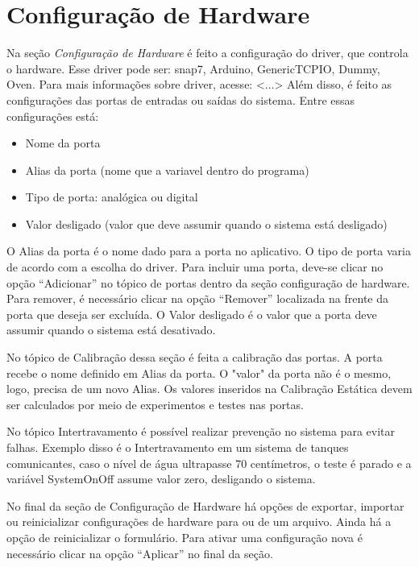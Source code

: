 
\chapter{Configuração de Hardware}%
\label{chapter:hardware-configuration}

Na seção \textit{Configuração de Hardware} é feito a configuração do driver, que
controla o hardware. Esse driver pode ser: snap7, Arduino, GenericTCPIO, Dummy,
Oven. Para mais informações sobre driver, acesse: <...> Além disso, é feito as
configurações das portas de entradas ou saídas do sistema. Entre essas
configurações está:

\begin{itemize}
    \item Nome da porta
    \item Alias da porta (nome que a variavel dentro do programa)
    \item Tipo de porta: analógica ou digital
    \item Valor desligado (valor que deve assumir quando o sistema está desligado)
\end{itemize}

O Alias da porta é o nome dado para a porta no aplicativo. O tipo de porta
varia de acordo com a escolha do driver. Para incluir uma porta, deve-se clicar
no opção “Adicionar” no tópico de portas dentro da seção configuração de
hardware. Para remover, é necessário clicar na opção “Remover” localizada na
frente da porta que deseja ser excluída. O Valor desligado é o valor que a
porta deve assumir quando o sistema está desativado.

No tópico de Calibração dessa seção é feita a calibração das portas. A porta
recebe o nome definido em Alias da porta. O "valor" da porta não é o mesmo,
logo, precisa de um novo Alias. Os valores inseridos na Calibração Estática
devem ser calculados por meio de experimentos e testes nas portas.

No tópico Intertravamento é possível realizar prevenção no sistema para evitar
falhas. Exemplo disso é o Intertravamento em um sistema de tanques
comunicantes, caso o nível de água ultrapasse 70 centímetros, o teste é parado
e a variável SystemOnOff assume valor zero, desligando o sistema.
	
No final da seção de Configuração de Hardware há opções de exportar, importar
ou reinicializar configurações de hardware para ou de um arquivo. Ainda há a
opção de reinicializar o formulário. Para ativar uma configuração nova é
necessário clicar na opção “Aplicar” no final da seção.
